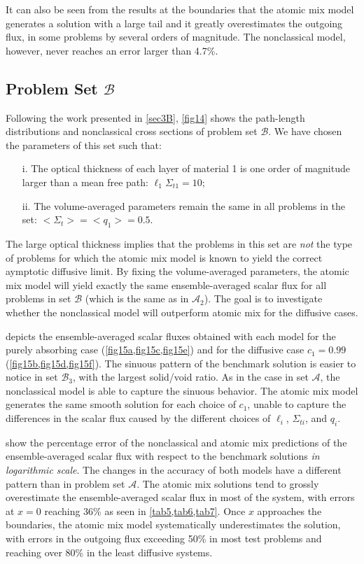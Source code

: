 \documentclass[12pt]{article}
\newcommand{\bl}{\big<}
\newcommand{\bg}{\big>}
\newcommand{\seta}{\mathcal{A}}
\newcommand{\setb}{\mathcal{B}}
\begin{document}
{It can also be seen from the results at the boundaries that the atomic mix model generates a solution with a large tail and it greatly overestimates the outgoing flux, in some problems by several orders of magnitude.
The nonclassical model, however, never reaches an error larger than 4.7\%.

\subsection{Problem Set $\setb$}

Following the work presented in \cref{sec3B}, \cref{fig14} shows the path-length distributions and nonclassical cross sections of problem set $\setb$.
We have chosen the parameters of this set such that:
\begin{itemize}
\item[i.] The optical thickness of each layer of material 1 is one order of magnitude larger than a mean free path: $\ell_1\Sigma_{t1} = 10$;
\vspace{-4pt}
\item[ii.] The volume-averaged parameters remain the same in all problems in the set: $\bl \Sigma_t \bg = \bl q_1 \bg = 0.5$.
\end{itemize}
The large optical thickness implies that the problems in this set are {\em not} the type of problems for which the atomic mix model is known to yield the correct aymptotic diffusive limit.
By fixing the volume-averaged parameters, the atomic mix model will yield exactly the same ensemble-averaged scalar flux for all problems in set $\setb$ (which is the same as in $\seta_2$).
The goal is to investigate whether the nonclassical model will outperform atomic mix for the diffusive cases.

 depicts the ensemble-averaged scalar fluxes obtained with each model for the purely absorbing case (\cref{fig15a,fig15c,fig15e}) and for the diffusive case $c_1=0.99$ (\cref{fig15b,fig15d,fig15f}).
The sinuous pattern of the benchmark solution is easier to notice in set $\setb_3$, with the largest solid/void ratio.
As in the case in set $\seta$, the nonclassical model is able to capture the sinuous behavior.
The atomic mix model generates the same smooth solution for each choice of $c_1$, unable to capture the differences in the scalar flux caused by the different choices of $\ell_i$, $\Sigma_{ti}$, and $q_i$.

 show the percentage error of the nonclassical and atomic mix predictions of the ensemble-averaged scalar flux with respect to the benchmark solutions {\em in logarithmic scale}.
The changes in the accuracy of both models have a different pattern than in problem set $\seta$.
The atomic mix solutions tend to grossly overestimate the ensemble-averaged scalar flux in most of the system, with errors at $x=0$ reaching 36\% as seen in \cref{tab5,tab6,tab7}.
Once $x$ approaches the boundaries, the atomic mix model systematically underestimates the solution, with errors in the outgoing flux exceeding 50\% in most test problems and reaching over 80\% in the least diffusive systems.

}
\end{document}
